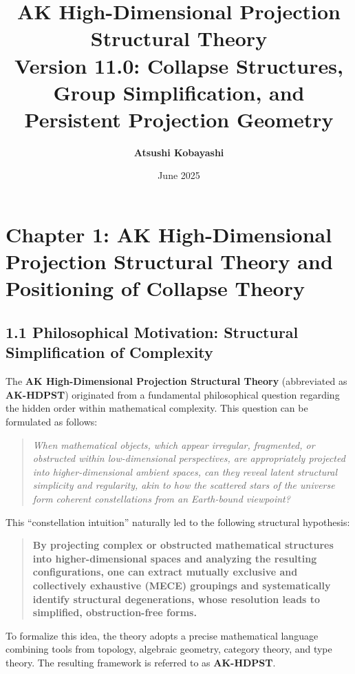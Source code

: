 \documentclass[11pt]{article}
\title{AK High-Dimensional Projection Structural Theory\\
\Large Version 11.0: Collapse Structures, Group Simplification, and Persistent Projection Geometry}
\author{\textbf{Atsushi Kobayashi} \quad {\small (with ChatGPT Research Partner)}}
\date{June 2025}
\begin{document}
\maketitle
\tableofcontents
\newpage


\section{Chapter 1: AK High-Dimensional Projection Structural Theory and Positioning of Collapse Theory}

\subsection*{1.1 Philosophical Motivation: Structural Simplification of Complexity}

The \textbf{AK High-Dimensional Projection Structural Theory} (abbreviated as \textbf{AK-HDPST}) originated from a fundamental philosophical question regarding the hidden order within mathematical complexity. This question can be formulated as follows:

\begin{quote}
\textit{
When mathematical objects, which appear irregular, fragmented, or obstructed within low-dimensional perspectives,  
are appropriately projected into higher-dimensional ambient spaces,  
can they reveal latent structural simplicity and regularity, akin to how the scattered stars of the universe form coherent constellations from an Earth-bound viewpoint?  
}
\end{quote}

This ``constellation intuition'' naturally led to the following structural hypothesis:

\begin{quote}
\textbf{By projecting complex or obstructed mathematical structures into higher-dimensional spaces and analyzing the resulting configurations,  
one can extract mutually exclusive and collectively exhaustive (MECE) groupings and systematically identify structural degenerations,  
whose resolution leads to simplified, obstruction-free forms.}
\end{quote}

To formalize this idea, the theory adopts a precise mathematical language combining tools from topology, algebraic geometry, category theory, and type theory. The resulting framework is referred to as \textbf{AK-HDPST}.
\end{document}
